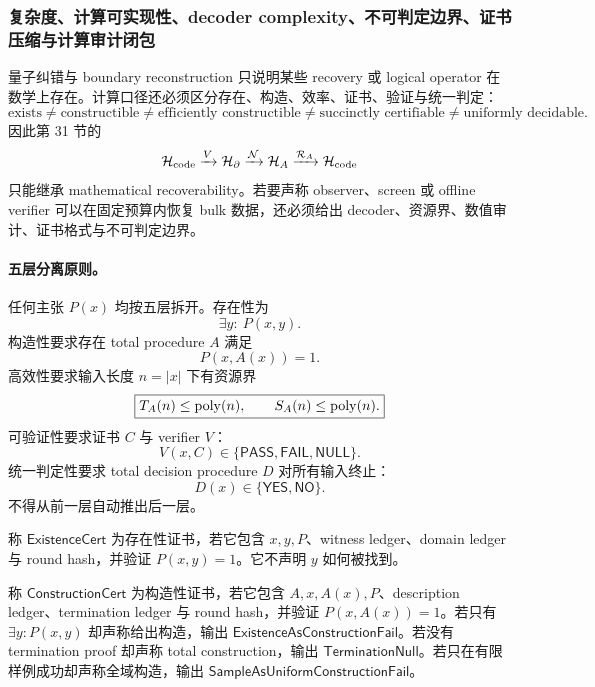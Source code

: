 \subsubsection{复杂度、计算可实现性、decoder complexity、不可判定边界、证书压缩与计算审计闭包}\label{subsubsec:typed-address-biaxial-completion-computational-audit-complexity-decidability-closure}
量子纠错与 boundary reconstruction 只说明某些 recovery 或 logical operator 在数学上存在。计算口径还必须区分存在、构造、效率、证书、验证与统一判定：
\[
\boxed{
\text{exists}
\ne
\text{constructible}
\ne
\text{efficiently constructible}
\ne
\text{succinctly certifiable}
\ne
\text{uniformly decidable}.
}
\]
因此第 31 节的
\[
\mathcal H_{\rm code}
\xrightarrow{V}
\mathcal H_\partial
\xrightarrow{\mathcal N}
\mathcal H_A
\xrightarrow{\mathcal R_A}
\mathcal H_{\rm code}
\]
只能继承 mathematical recoverability。若要声称 observer、screen 或 offline verifier 可以在固定预算内恢复 bulk 数据，还必须给出 decoder、资源界、数值审计、证书格式与不可判定边界。

\paragraph{五层分离原则。}
任何主张 \(P(x)\) 均按五层拆开。存在性为
\[
\boxed{\exists y:\ P(x,y).}
\]
构造性要求存在 total procedure \(A\) 满足
\[
\boxed{P(x,A(x))=1.}
\]
高效性要求输入长度 \(n=|x|\) 下有资源界
\[
\boxed{
T_A(n)\le {\rm poly}(n),
\qquad
S_A(n)\le {\rm poly}(n).
}
\]
可验证性要求证书 \(C\) 与 verifier \(V\)：
\[
\boxed{
V(x,C)\in\{\mathsf{PASS},\mathsf{FAIL},\mathsf{NULL}\}.
}
\]
统一判定性要求 total decision procedure \(D\) 对所有输入终止：
\[
\boxed{
D(x)\in\{\mathsf{YES},\mathsf{NO}\}.
}
\]
不得从前一层自动推出后一层。

\begin{definition}[存在性与构造性证书]\label{def:typed-address-biaxial-completion-existence-construction-cert}
称 \(\mathsf{ExistenceCert}\) 为存在性证书，若它包含 \(x,y,P\)、witness ledger、domain ledger 与 round hash，并验证 \(P(x,y)=1\)。它不声明 \(y\) 如何被找到。

称 \(\mathsf{ConstructionCert}\) 为构造性证书，若它包含 \(A,x,A(x),P\)、description ledger、termination ledger 与 round hash，并验证 \(P(x,A(x))=1\)。若只有 \(\exists y:P(x,y)\) 却声称给出构造，输出 \(\mathsf{ExistenceAsConstructionFail}\)。若没有 termination proof 却声称 total construction，输出 \(\mathsf{TerminationNull}\)。若只在有限样例成功却声称全域构造，输出 \(\mathsf{SampleAsUniformConstructionFail}\)。
\end{definition}

